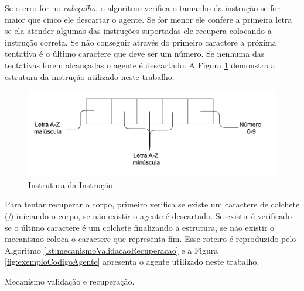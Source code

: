 Se o erro for no \emph{cabeçalho}, o algoritmo verifica o tamanho da instrução se for maior que cinco ele descartar o agente. Se for menor ele confere a primeira letra se ela atender algumas das instruções suportadas ele recupera colocando a instrução correta. Se não conseguir através do primeiro caractere a próxima tentativa é o último caractere que deve ser um número. Se nenhuma das tentativas forem alcançadas o agente é descartado. A Figura \ref{fig:estruturaInstrucao} demonstra a estrutura da instrução utilizado neste trabalho.

\begin{figure}[htbp]
	\centering
	\includegraphics[scale=0.27]{metodologia/figuras/estruturaInstrucao.pdf}
	\caption{Instrutura da Instrução.}
	\label{fig:estruturaInstrucao}
\end{figure}

Para tentar recuperar o corpo, primeiro verifica se existe um caractere de colchete (\emph{[}) iniciando o corpo, se não existir o agente é descartado. Se existir é verificado se o último caractere é um colchete finalizando a estrutura, se não existir o mecanismo coloca o caractere que representa fim. Esse roteiro é reproduzido pelo Algoritmo \ref{lst:mecanismoValidacaoRecuperacao} e a Figura \ref{fig:exemploCodigoAgente} apresenta o agente utilizado neste trabalho.

\begin{algorithm}
	\scriptsize
	\Inicio{
		\Entrada{Agente}
		$instrucoes = agente.pegarInstrucoes()$\;
		$i \gets 0$\;

		\uIf{agente.contem([)}{
			\Repita{$i < instrucoes.quantidade$}{
				$instrucao \gets instrucao[i]$ \;
				\uIf{$instrucao.tamanho < 5$}{
					\uIf{verificar(instrucao.primeiroCaracter)}{
						$instrucao \gets recuperar(instrucao.primeiroCaracter)$\;
					}
					\Else{
						\uIf(verficar(instrucao.ultimoCaracter)){
							$instrucao \gets recuperar(instrucao.ultimoCaracter)$\;
						}
						\Else{
							agente.remover()\;
						}
					}
					
				}
				\Else{
					agente.remover()\;
				}
				i++\;
			}
			\uIf{$agente.ultimoCaracter \neq ]$}{
				$agente.ultimoCaracter \gets ]$
			}
		}
		\Else{
			agente.remover()\;
		}
	}

		
	\caption{Mecanismo validação e recuperação.}
	\label{lst:mecanismoValidacaoRecuperacao}
\end{algorithm}

